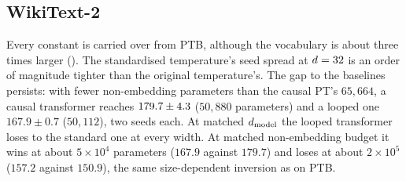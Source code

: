 \begin{table}[ht]
\centering\footnotesize

\caption{Factored labels, three seeds. Family P walks two iso-parameter diagonals ($8{,}256$ and
$32{,}896$ non-embedding parameters), so $\nlab$ rises with $\ncomp$; family W adds the remaining
fixed-width cells. Family W holds the total width fixed, which is where the prediction of
 applies; on family P, $\nlab$ rises with $\ncomp$, so a mean-field gain there
comes from label width, not from factoring. Original temperature, $\alpha_Z=0.25$, $\nchan=4$.
Italic ranges
and collapse counts as in the introduction to this appendix.}
\label{tab:factored}
\end{table}

\subsection{WikiText-2}
\label{app:grid-wt2}

Every constant is carried over from PTB, although the vocabulary is about three times larger
(). The standardised temperature's seed spread at $d=32$ is an order of
magnitude tighter than the original temperature's. The gap to the baselines persists: with fewer
non-embedding parameters than the causal PT's $65{,}664$, a causal transformer reaches
$179.7\pm4.3$ ($50{,}880$ parameters) and a looped one $167.9\pm0.7$
($50{,}112$), two seeds each. At matched $d_{\text{model}}$ the looped transformer loses to the standard
one at every width. At matched non-embedding budget it wins at about $5\times10^4$ parameters
($167.9$ against $179.7$) and loses at about $2\times10^5$ ($157.2$ against $150.9$), the same
size-dependent inversion as on PTB.
